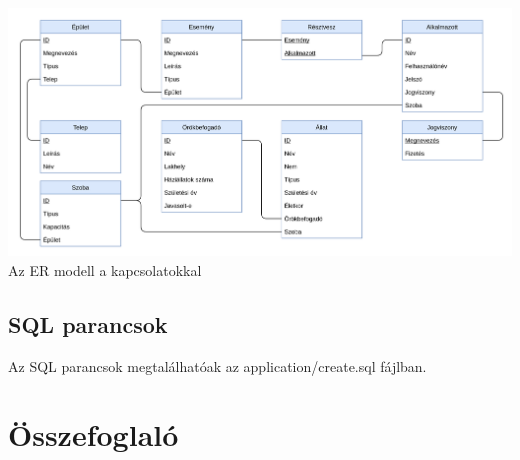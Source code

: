 \documentclass[a4paper,12pt]{article}
\begin{document}
\begin{center}
	\includegraphics[width = 18cm]{"SQL_Táblák_kapcsolatok.png"} \\
	{\small Az ER modell a kapcsolatokkal}
\end{center}
\subsection{SQL parancsok}
Az SQL parancsok megtalálhatóak az application/create.sql fájlban.
\section{Összefoglaló}
\end{document}
